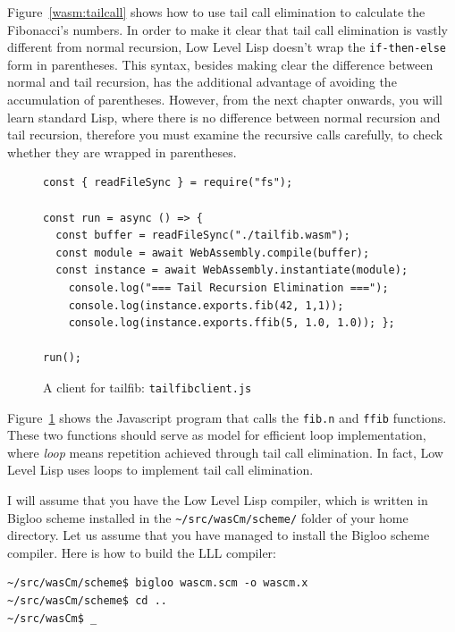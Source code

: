 \documentclass[a4paper,12pt]{book}
\begin{document}
Figure~\ref{wasm:tailcall} shows how to use tail
call elimination to calculate the Fibonacci's numbers.
In order to make it clear that tail call elimination
is vastly different from normal recursion, Low Level
Lisp doesn't wrap the \verb|if-then-else| form in
parentheses. This syntax, besides making clear the
difference between normal and tail recursion,
has the additional advantage of avoiding the accumulation
of parentheses. However, from the next chapter onwards,
you will learn standard Lisp, where there is no difference
between normal recursion and tail recursion, therefore you
must examine the recursive calls carefully, to check
whether they are wrapped in parentheses.
\begin{figure}[!h]
\begin{verbatim}
const { readFileSync } = require("fs");

const run = async () => {
  const buffer = readFileSync("./tailfib.wasm");
  const module = await WebAssembly.compile(buffer);
  const instance = await WebAssembly.instantiate(module);
    console.log("=== Tail Recursion Elimination ===");
    console.log(instance.exports.fib(42, 1,1));
    console.log(instance.exports.ffib(5, 1.0, 1.0)); };

run();
\end{verbatim}
  \caption{A client for tailfib: {\tt tailfibclient.js}}
  \label{wasm:tailfibclient}
\end{figure}

Figure~\ref{wasm:tailfibclient} shows the Javascript
program that calls the \verb|fib.n| and \verb|ffib|
functions. These two functions should serve as model
for efficient loop implementation, where {\em loop}
means repetition achieved through tail call elimination.
In fact, Low Level Lisp uses loops to implement tail
call elimination.

I will assume that you have the Low Level Lisp compiler,
which is written in Bigloo scheme installed in the
\verb|~/src/wasCm/scheme/| folder of your home directory.
Let us assume that you have managed to install the
Bigloo scheme compiler. Here is how to build the
LLL compiler:
\begin{verbatim}
~/src/wasCm/scheme$ bigloo wascm.scm -o wascm.x
~/src/wasCm/scheme$ cd ..
~/src/wasCm$ _
\end{verbatim}
\end{document}
